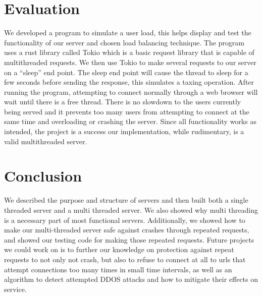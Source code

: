 \documentclass[conference]{IEEEtran}
\begin{document}
\section{Evaluation}
We developed a program to simulate a user load, this helps display and test the functionality of our server and chosen load balancing technique. The program uses a rust library called Tokio which is a basic request library that is capable of multithreaded requests. We then use Tokio to make several requests to our server on a “sleep” end point. The sleep end point will cause the thread to sleep for a few seconds before sending the response, this simulates a taxing operation. After running the program, attempting to connect normally through a web browser will wait until there is a free thread. There is no slowdown to the users currently being served and it prevents too many users from attempting to connect at the same time and overloading or crashing the server. Since all functionality works as intended, the project is a success our implementation, while rudimentary, is a valid multithreaded server.
\section{Conclusion}
We described the purpose and structure of servers and then built both a single threaded server and a multi threaded server. We also showed why multi threading is a necessary part of most functional servers. Additionally, we showed how to make our multi-threaded server safe against crashes through repeated requests, and showed our testing code for making those repeated requests. Future projects we could work on is to further our knowledge on protection against repeat requests to not only not crash, but also to refuse to connect at all to urls that attempt connections too many times in small time intervals, as well as an algorithm to detect attempted DDOS attacks and how to mitigate their effects on service.
\end{document}
